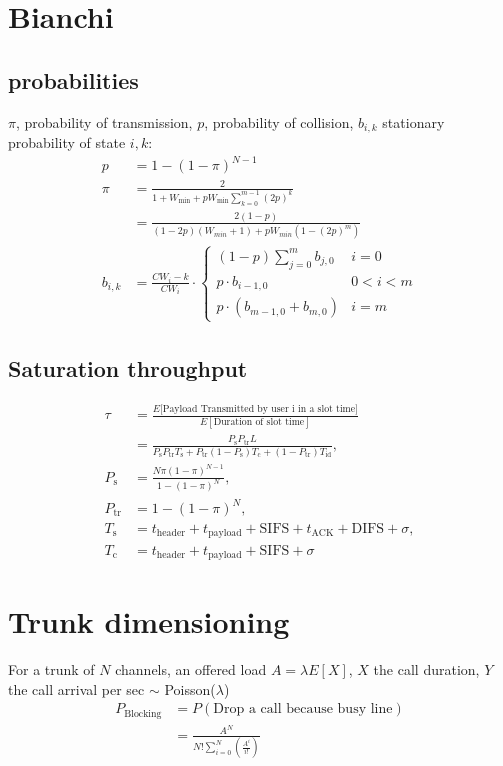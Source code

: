 \documentclass[10pt, a4paper,twocolumn]{scrartcl}
\begin{document}
\section{Bianchi}

\subsection{probabilities}
$\pi$, probability of transmission, $p$, probability of collision,
$b_{i,k}$ stationary probability of state $i,k$:
\begin{align*}
p &= 1-(1-\pi)^{N-1} \\
\pi &= \frac{2}{ 1 + W_\textrm{min} + pW_\textrm{min}\sum^{m-1}_{k=0}(2p)^k}\\
	 &= \frac{2(1-p)}{(1-2p)(W_{min} + 1)+pW_{min}(1-(2p)^m)}\\
b_{i,k} &= \frac{CW_i - k}{CW_i} \cdot \left \{ \begin{array}{ll}
    (1-p) \sum_{j=0}^m b_{j,0} & i = 0\\
    p \cdot b_{i-1,0} & 0 < i < m\\
    p \cdot (b_{m-1,0} + b_{m,0}) & i = m
    \end{array} \right.
\end{align*}

\subsection{Saturation throughput}

\begin{align*}
 \tau &= \frac{E\lbrack\textrm{Payload Transmitted by user i in a slot time}\rbrack}{E[\textrm{Duration of slot time}]} \\ 
 &= \frac{P_\textrm{s}P_{\textrm{tr}}L}{P_\textrm{s}P_{\textrm{tr}}T_{\textrm{s}} + P_\textrm{tr}(1-P_\textrm{s})T_\textrm{c} + (1-P_\textrm{tr})T_\textrm{id}}, \\
 P_\textrm{s} &= \frac{N\pi (1-\pi)^{N-1}}{1-(1-\pi)^N}, \\
 P_\textrm{tr} &= 1-(1-\pi)^N, \\
 T_\textrm{s} &= t_\textrm{header} + t_\textrm{payload} + \textrm{SIFS} + t_\textrm{ACK} + \textrm{DIFS} + \sigma,\\
 T_\textrm{c} &= t_\textrm{header} + t_\textrm{payload} + \textrm{SIFS} + \sigma
\end{align*}

\section{Trunk dimensioning}
For a trunk of $N$ channels, an offered load $A=\lambda E[X]$, $X$ the call duration, $Y$ the call arrival per sec $\sim$ Poisson($\lambda$) 
\begin{align*}
	P_\textrm{Blocking} &= P(\textrm{Drop a call because busy line})  \\
	&= \frac{A^N}{N!\sum^N_{i=0}(\frac{A^i}{i!})}
\end{align*}
\end{document}
